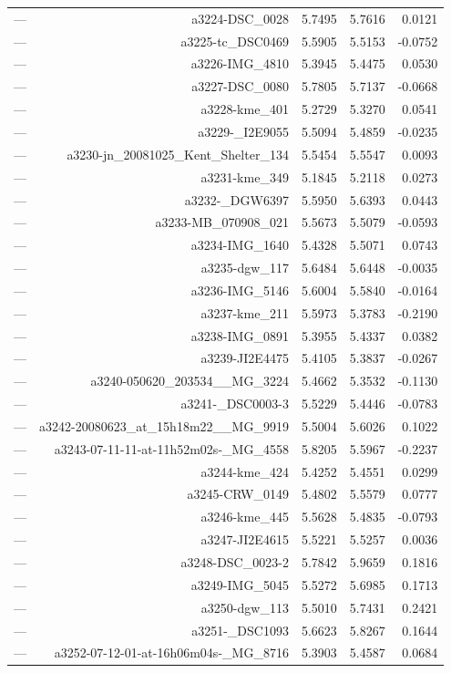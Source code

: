 \begin{table}[htbp]
\begin{tabular}{lrrrr}
— & a3224-DSC_0028 & 5.7495 & 5.7616 & 0.0121 \\
— & a3225-tc_DSC0469 & 5.5905 & 5.5153 & -0.0752 \\
— & a3226-IMG_4810 & 5.3945 & 5.4475 & 0.0530 \\
— & a3227-DSC_0080 & 5.7805 & 5.7137 & -0.0668 \\
— & a3228-kme_401 & 5.2729 & 5.3270 & 0.0541 \\
— & a3229-_I2E9055 & 5.5094 & 5.4859 & -0.0235 \\
— & a3230-jn_20081025_Kent_Shelter_134 & 5.5454 & 5.5547 & 0.0093 \\
— & a3231-kme_349 & 5.1845 & 5.2118 & 0.0273 \\
— & a3232-_DGW6397 & 5.5950 & 5.6393 & 0.0443 \\
— & a3233-MB_070908_021 & 5.5673 & 5.5079 & -0.0593 \\
— & a3234-IMG_1640 & 5.4328 & 5.5071 & 0.0743 \\
— & a3235-dgw_117 & 5.6484 & 5.6448 & -0.0035 \\
— & a3236-IMG_5146 & 5.6004 & 5.5840 & -0.0164 \\
— & a3237-kme_211 & 5.5973 & 5.3783 & -0.2190 \\
— & a3238-IMG_0891 & 5.3955 & 5.4337 & 0.0382 \\
— & a3239-JI2E4475 & 5.4105 & 5.3837 & -0.0267 \\
— & a3240-050620_203534__MG_3224 & 5.4662 & 5.3532 & -0.1130 \\
— & a3241-_DSC0003-3 & 5.5229 & 5.4446 & -0.0783 \\
— & a3242-20080623_at_15h18m22__MG_9919 & 5.5004 & 5.6026 & 0.1022 \\
— & a3243-07-11-11-at-11h52m02s-_MG_4558 & 5.8205 & 5.5967 & -0.2237 \\
— & a3244-kme_424 & 5.4252 & 5.4551 & 0.0299 \\
— & a3245-CRW_0149 & 5.4802 & 5.5579 & 0.0777 \\
— & a3246-kme_445 & 5.5628 & 5.4835 & -0.0793 \\
— & a3247-JI2E4615 & 5.5221 & 5.5257 & 0.0036 \\
— & a3248-DSC_0023-2 & 5.7842 & 5.9659 & 0.1816 \\
— & a3249-IMG_5045 & 5.5272 & 5.6985 & 0.1713 \\
— & a3250-dgw_113 & 5.5010 & 5.7431 & 0.2421 \\
— & a3251-_DSC1093 & 5.6623 & 5.8267 & 0.1644 \\
— & a3252-07-12-01-at-16h06m04s-_MG_8716 & 5.3903 & 5.4587 & 0.0684 \\

\end{tabular}
\end{table}
